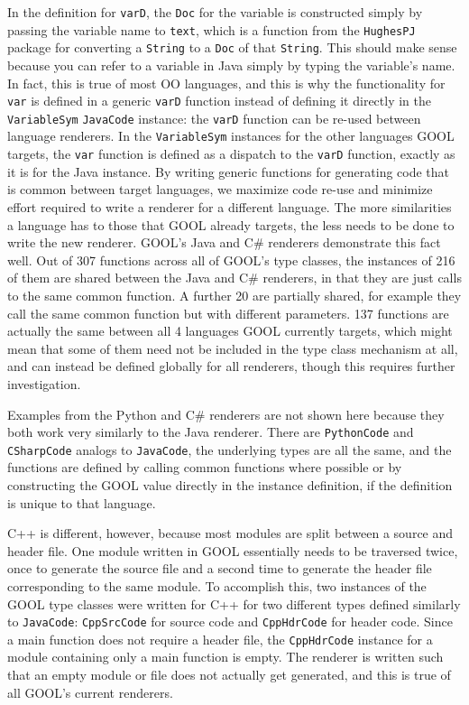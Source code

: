 \documentclass[sigplan,review,anonymous]{acmart}
\begin{document}
In the definition for \verb|varD|, the \verb|Doc| for the variable is 
constructed simply by passing the variable name to \verb|text|, which is a 
function from the \verb|HughesPJ| package for converting a \verb|String| to a 
\verb|Doc| of that \verb|String|. This should make sense because you can refer 
to a variable in Java simply by typing the variable's name. In fact, this is 
true of most OO languages, and this is why the functionality for \verb|var| is 
defined in a generic \verb|varD| function instead of defining it directly in 
the \verb|VariableSym| \verb|JavaCode| instance: the \verb|varD| function can 
be re-used between language renderers. In the \verb|VariableSym| instances for 
the other languages GOOL targets, the \verb|var| function is defined as a 
dispatch to the \verb|varD| function, exactly as it is for the Java instance. 
By writing generic functions for generating code that is common between target 
languages, we maximize code re-use and minimize effort required to write a 
renderer for a different language. The more similarities a language has to 
those that GOOL already targets, the less needs to be done to write the new 
renderer. GOOL's Java and C\# renderers demonstrate this fact well. Out of 307 
functions across all of GOOL's type classes, the instances of 216 of them are 
shared between the Java and C\# renderers, in that they are just calls to the 
same common function. A further 20 are partially shared, for example they call 
the same common function but with different parameters. 137 functions are 
actually the same between all 4 languages GOOL currently targets, which might 
mean that some of them need not be included in the type class mechanism at all, 
and can instead be defined globally for all renderers, though this requires 
further investigation.

Examples from the Python and C\# renderers are not shown here because they both 
work very similarly to the Java renderer. There are \verb|PythonCode| and 
\verb|CSharpCode| analogs to \verb|JavaCode|, the underlying types are all the 
same, and the functions are defined by calling common functions where possible 
or by constructing the GOOL value directly in the instance definition, if the 
definition is unique to that language.

C++ is different, however, because most modules are split between a source and 
header file. One module written in GOOL essentially needs to be traversed 
twice, once to generate the source file and a second time to generate the 
header file corresponding to the same module. To accomplish this, two instances 
of the GOOL type classes were written for C++ for two different types defined 
similarly to \verb|JavaCode|: \verb|CppSrcCode| for source code and 
\verb|CppHdrCode| for header code. Since a main function does not require a 
header file, the \verb|CppHdrCode| instance for a module containing only a main 
function is empty. The renderer is written such that an empty module or file 
does not actually get generated, and this is true of all GOOL's current 
renderers. 
\end{document}

